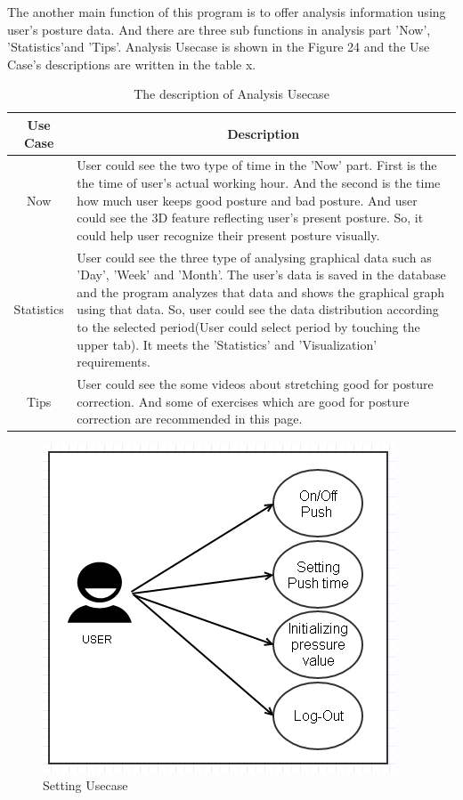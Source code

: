 \documentclass[conference]{IEEEtran}
\begin{document}
 The another main function of this program is to offer analysis information using user's posture data. And there are three sub functions in analysis part 'Now', 'Statistics'and 'Tips'. Analysis Usecase is shown in the Figure 24 and the Use Case's descriptions are written in the table x. 

\begin{table}[h]
{\renewcommand\arraystretch{1.25}
\caption{The description of Analysis Usecase}
\begin{tabular}{|c|l|l|} \hline
Use Case & \multicolumn{2}{c|}{Description} \\ \hline\hline
Now & \multicolumn{2}{p{6cm}|}{\raggedright User could see the two type of time in the 'Now' part. First is the the time of user's actual working hour. And the second is the time how much user keeps good posture and bad posture. And user could see the 3D feature reflecting user's present posture. So, it could help user recognize their present posture visually.} \\ \hline
Statistics & \multicolumn{2}{p{6cm}|}{\raggedright User could see the three type of analysing graphical data such as 'Day', 'Week' and 'Month'. The user's data is saved in the database and the program analyzes that data and shows the graphical graph using that data. So, user could see the data distribution according to the selected period(User could select period by touching the upper tab).  It meets the 'Statistics' and 'Visualization' requirements.} \\ \hline
Tips & \multicolumn{2}{p{6cm}|}{\raggedright User could see the some videos about stretching good for posture correction. And some of exercises which are good for posture correction  are recommended in this page.} \\ \hline
\end{tabular}}
\end{table}

\begin{figure}[H]
\begin{center}
    \includegraphics[scale=0.8]{img_22.png}
    \caption{Setting Usecase} 
\end{center}
\end{figure}
  	        	  
\end{document}
